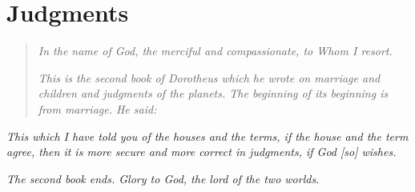 \chapter{Judgments}
\begin{quote}
\textsl{In the name of God, the merciful and compassionate, to Whom I resort.}

\textsl{This is the second book of Dorotheus which he wrote on marriage and children and judgments of the planets. The beginning of its beginning is from marriage. He said:}
\end{quote}



































\textsl{This which I have told you of the houses and the terms, if the house and the term agree, then it is more secure and more correct in judgments, if God [so] wishes.}

\textsl{The second book ends. Glory to God, the lord of the two worlds.}
